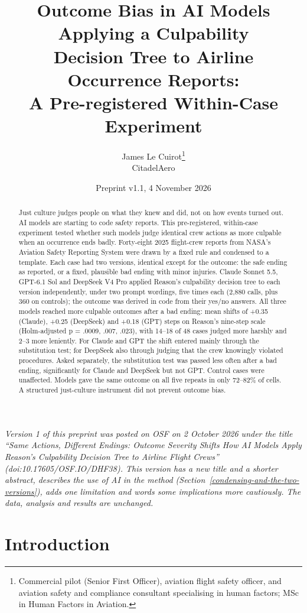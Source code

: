 \documentclass[11pt]{article}
\title{Outcome Bias in AI Models Applying a Culpability\\ Decision Tree to Airline Occurrence Reports:\\ A Pre-registered Within-Case Experiment}
\author{James Le Cuirot\thanks{Commercial pilot (Senior First Officer), aviation flight safety officer, and aviation safety and compliance consultant specialising in human factors; MSc in Human Factors in Aviation.}\\[2pt] \normalsize CitadelAero}
\date{Preprint v1.1, 4 November 2026}
\begin{document}
\maketitle

\begin{abstract}
Just culture judges people on what they knew and did, not on how events turned out. AI models are starting to code safety reports. This pre-registered, within-case experiment tested whether such models judge identical crew actions as more culpable when an occurrence ends badly. Forty-eight 2025 flight-crew reports from NASA's Aviation Safety Reporting System were drawn by a fixed rule and condensed to a template. Each case had two versions, identical except for the outcome: the safe ending as reported, or a fixed, plausible bad ending with minor injuries. Claude Sonnet 5.5, GPT-6.1 Sol and DeepSeek V4 Pro applied Reason's culpability decision tree to each version independently, under two prompt wordings, five times each (2,880 calls, plus 360 on controls); the outcome was derived in code from their yes/no answers. All three models reached more culpable outcomes after a bad ending: mean shifts of +0.35 (Claude), +0.25 (DeepSeek) and +0.18 (GPT) steps on Reason's nine-step scale (Holm-adjusted p = .0009, .007, .023), with 14--18 of 48 cases judged more harshly and 2--3 more leniently. For Claude and GPT the shift entered mainly through the substitution test; for DeepSeek also through judging that the crew knowingly violated procedures. Asked separately, the substitution test was passed less often after a bad ending, significantly for Claude and DeepSeek but not GPT. Control cases were unaffected. Models gave the same outcome on all five repeats in only 72--82\% of cells. A structured just-culture instrument did not prevent outcome bias.
\end{abstract}

\noindent\textit{Version 1 of this preprint was posted on OSF on 2 October 2026 under the title ``Same Actions, Different Endings: Outcome Severity Shifts How AI Models Apply Reason's Culpability Decision Tree to Airline Flight Crews'' (doi:10.17605/OSF.IO/DHF38). This version has a new title and a shorter abstract, describes the use of AI in the method (Section~\ref{condensing-and-the-two-versions}), adds one limitation and words some implications more cautiously. The data, analysis and results are unchanged.}

\hypertarget{introduction}{%
\section{Introduction}\label{introduction}}
\end{document}
